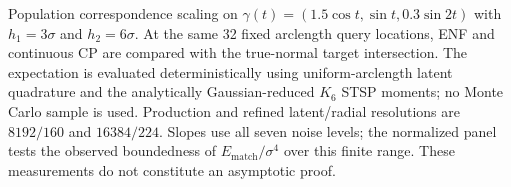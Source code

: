 \caption{Population correspondence scaling on $\gamma(t)=(1.5\cos t,\sin t,0.3\sin2t)$ with $h_1=3\sigma$ and $h_2=6\sigma$. At the same 32 fixed arclength query locations, ENF and continuous CP are compared with the true-normal target intersection. The expectation is evaluated deterministically using uniform-arclength latent quadrature and the analytically Gaussian-reduced $K_6$ STSP moments; no Monte Carlo sample is used. Production and refined latent/radial resolutions are $8192/160$ and $16384/224$. Slopes use all seven noise levels; the normalized panel tests the observed boundedness of $E_{\mathrm{match}}/\sigma^4$ over this finite range. These measurements do not constitute an asymptotic proof.}
